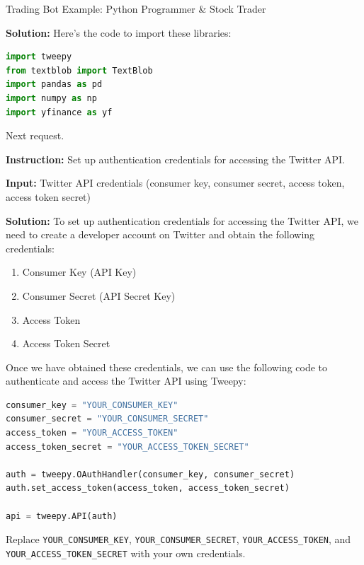 \begin{AIBoxBreak}{Trading Bot Example: Python Programmer \& Stock Trader}
	\assistantmsg

	\textbf{Solution:} Here's the code to import these libraries:


	\begin{lstlisting}[language=Python]
import tweepy
from textblob import TextBlob
import pandas as pd
import numpy as np
import yfinance as yf
\end{lstlisting}

	Next request.\\

	\usermsg

	\textbf{Instruction:} Set up authentication credentials for accessing the Twitter API.

	\textbf{Input: }Twitter API credentials (consumer key, consumer secret, access token, access token secret)\\

	\assistantmsg

	\textbf{Solution:} To set up authentication credentials for accessing the Twitter API, we need to create a developer account on Twitter and obtain the following credentials:

	\begin{enumerate}
		\item  Consumer Key (API Key)
		\item  Consumer Secret (API Secret Key)
		\item  Access Token
		\item  Access Token Secret
	\end{enumerate}

	Once we have obtained these credentials, we can use the following code to authenticate and access the Twitter API using Tweepy:

	\begin{lstlisting}[language=Python]
consumer_key = "YOUR_CONSUMER_KEY"
consumer_secret = "YOUR_CONSUMER_SECRET"
access_token = "YOUR_ACCESS_TOKEN"
access_token_secret = "YOUR_ACCESS_TOKEN_SECRET"

auth = tweepy.OAuthHandler(consumer_key, consumer_secret)
auth.set_access_token(access_token, access_token_secret)

api = tweepy.API(auth)
\end{lstlisting}



	Replace \texttt{YOUR\_CONSUMER\_KEY}, \texttt{YOUR\_CONSUMER\_SECRET}, \texttt{YOUR\_ACCESS\_TOKEN}, and \texttt{YOUR\_ACCESS\_TOKEN\_SECRET} with your own credentials.


\end{AIBoxBreak}
